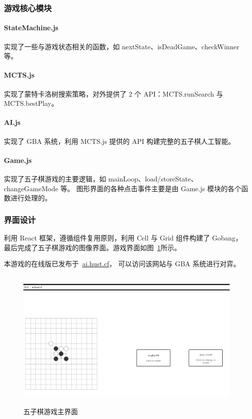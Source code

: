 \documentclass[UTF8,cs4size]{ctexart}
\begin{document}
\subsubsection{游戏核心模块}
\paragraph{StateMachine.js}
实现了一些与游戏状态相关的函数，如 nextState、isDeadGame、checkWinner 等。
\paragraph{MCTS.js}
实现了蒙特卡洛树搜索策略，对外提供了 2 个 API：MCTS.runSearch 与 MCTS.bestPlay。
\paragraph{AI.js}
实现了 GBA 系统，利用 MCTS.js 提供的 API 构建完整的五子棋人工智能。
\paragraph{Game.js}
实现了五子棋游戏的主要逻辑，如 mainLoop、load/storeState、changeGameMode 等。
图形界面的各种点击事件主要是由 Game.js 模块的各个函数进行处理的。
\subsubsection{界面设计}
利用 React 框架，遵循组件复用原则，利用 Cell 与 Grid 组件构建了 Gobang，
最后完成了五子棋游戏的图像界面。游戏界面如图~\ref{fig:UI}所示。

本游戏的在线版已发布于~\href{http://ai.hust.cf}{ai.hust.cf}，
可以访问该网站与 GBA 系统进行对弈。

\begin{figure}[htb]
  \centering
  \includegraphics[width=\textwidth,height=7cm]{figures/final_UI.png}
  \caption{五子棋游戏主界面}
  \label{fig:UI}
\end{figure}
\end{document}
